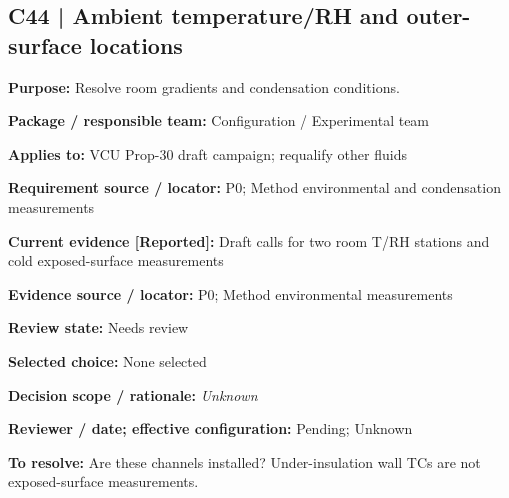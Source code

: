 \documentclass[11pt]{article}
\begin{document}
\begin{minipage}{\textwidth}\small\setlength{\parskip}{2pt}
\subsection*{C44 | Ambient temperature/RH and outer-surface locations}
\textbf{Purpose:} Resolve room gradients and condensation conditions.\par
\textbf{Package / responsible team:} Configuration / Experimental team\par
\textbf{Applies to:} VCU Prop-30 draft campaign; requalify other fluids\par
\textbf{Requirement source / locator:} P0; Method environmental and condensation measurements\par
\textbf{Current evidence [Reported]:} Draft calls for two room T/RH stations and cold exposed-surface measurements\par
\textbf{Evidence source / locator:} P0; Method environmental measurements\par
\textbf{Review state:} Needs review\par
\textbf{Selected choice:} None selected\par
\textbf{Decision scope / rationale:} \textit{Unknown}\par
\textbf{Reviewer / date; effective configuration:} Pending; Unknown\par
\textbf{To resolve:} Are these channels installed? Under-insulation wall TCs are not exposed-surface measurements.\par
\end{minipage}\par\vspace{5pt}
\end{document}
